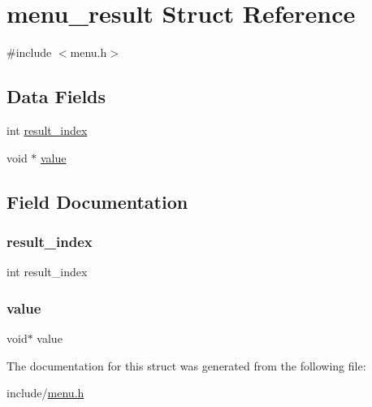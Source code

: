 \hypertarget{structmenu__result}{}\section{menu\+\_\+result Struct Reference}
\label{structmenu__result}


{\ttfamily \#include $<$menu.\+h$>$}

\subsection*{Data Fields}
\begin{DoxyCompactItemize}
\item 
int \hyperlink{structmenu__result_ae3056b14bf39f02e9435b9b5b8f71bad}{result\+\_\+index}
\item 
void $\ast$ \hyperlink{structmenu__result_a0f61d63b009d0880a89c843bd50d8d76}{value}
\end{DoxyCompactItemize}


\subsection{Field Documentation}
\mbox{\label{structmenu__result_ae3056b14bf39f02e9435b9b5b8f71bad}} 
\subsubsection{\texorpdfstring{result\+\_\+index}{result\_index}}
{\footnotesize\ttfamily int result\+\_\+index}

\mbox{\label{structmenu__result_a0f61d63b009d0880a89c843bd50d8d76}} 
\subsubsection{\texorpdfstring{value}{value}}
{\footnotesize\ttfamily void$\ast$ value}



The documentation for this struct was generated from the following file\+:\begin{DoxyCompactItemize}
\item 
include/\hyperlink{menu_8h}{menu.\+h}\end{DoxyCompactItemize}

